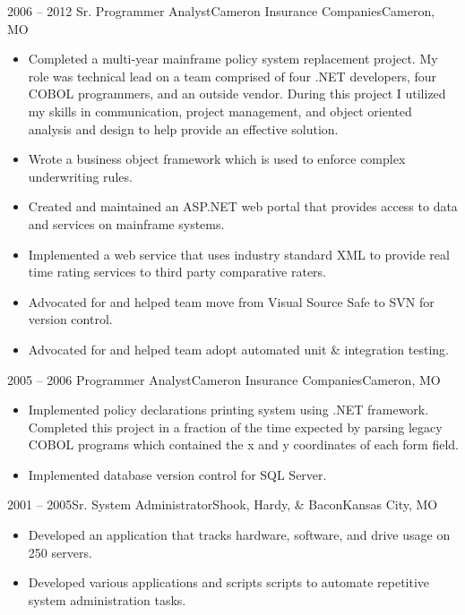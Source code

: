 \documentclass[11pt,letterpaper,final]{moderncv}
\begin{document}
	\cventry
{2006 -- 2012} {Sr. Programmer Analyst}{Cameron Insurance Companies}{Cameron, MO}{}{
		\begin{itemize}
			\item 
				Completed a multi-year mainframe policy system
				replacement project. My role was technical lead on a
				team comprised of four .NET developers, four COBOL
				programmers, and an outside vendor. During this project
				I utilized my skills in communication, project
				management, and object oriented analysis and design to
				help provide an effective solution.
			\item 
				Wrote a business object framework which is used to enforce
				complex underwriting rules.
			\item 
				Created and maintained an ASP.NET web portal that provides
				access to data and services on mainframe systems.
			\item 
				Implemented a web service that uses industry standard XML to
				provide real time rating services to third party comparative
				raters.
			\item
				Advocated for and helped team move from Visual Source Safe to
				SVN for version control.
			\item
				Advocated for and helped team adopt automated unit \& integration
				testing.
		\end{itemize}
}
\linebreak

	\cventry
{2005 -- 2006} {Programmer Analyst}{Cameron Insurance Companies}{Cameron, MO}{}{
		\begin{itemize}
			\item
				Implemented policy declarations printing system using .NET framework.
				Completed this project in a fraction of the time expected by
				parsing legacy COBOL programs which contained the x and y
				coordinates of each form field.
			\item
				Implemented database version control for SQL Server.
		\end{itemize}
}
\linebreak

	\cventry
{2001 -- 2005}{Sr. System Administrator}{Shook, Hardy, \& Bacon}{Kansas City, MO}{}{
		\begin{itemize}
			\item
				Developed an application that tracks hardware, software, and
				drive usage on 250 servers.
			\item
				Developed various applications and scripts scripts to
				automate repetitive system administration tasks.
		\end{itemize}
}
\linebreak
\end{document}
